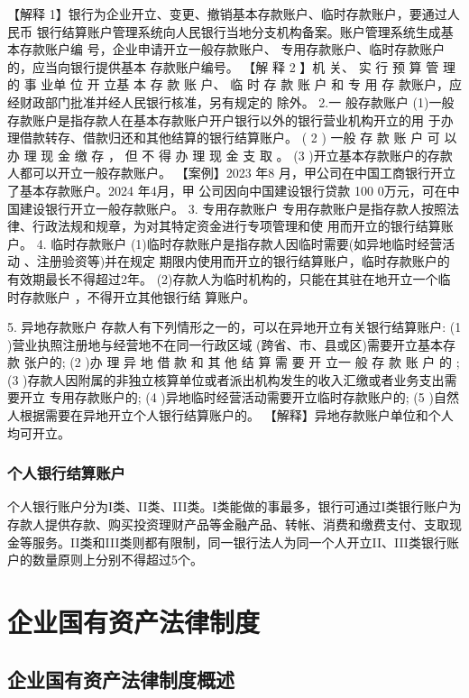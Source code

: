 \documentclass[UTF8,12pt]{ctexart}
\numberwithin{equation}{section} %
\numberwithin{figure}{section}
\numberwithin{table}{section}
\begin{document}
	【解释 1】银行为企业开立、变更、撤销基本存款账户、临时存款账户，要通过人民币
	银行结算账户管理系统向人民银行当地分支机构备案。账户管理系统生成基本存款账户编
	号，企业申请开立一般存款账户、 专用存款账户、临时存款账户的，应当向银行提供基本
	存款账户编号。
	【解 释 2 】机 关、 实 行 预 算 管 理 的 事 业单 位 开 立基 本 存 款 账 户、 临 时 存 款 账 户 和 专 用 存
	款账户，应经财政部门批准并经人民银行核准，另有规定的 除外。
	2.一 般存款账户
	(1)一般存款账户是指存款人在基本存款账户开户银行以外的银行营业机构开立的用 于办
	理借款转存、借款归还和其他结算的银行结算账户。
	( 2 ) 一般 存 款 账 户 可 以 办 理 现 金 缴 存 ， 但 不 得 办 理 现 金 支 取 。
	(3 )开立基本存款账户的存款人都可以开立一般存款账户。
	【案例】2023 年8 月，甲公司在中国工商银行开立了基本存款账户。2024 年4月，甲
	公司因向中国建设银行贷款 100 0万元，可在中国建设银行开立一般存款账户。
	3. 专用存款账户
	专用存款账户是指存款人按照法律、行政法规和规章，为对其特定资金进行专项管理和使
	用而开立的银行结算账户。
	4. 临时存款账户
	(1)临时存款账户是指存款人因临时需要(如异地临时经营活动 、注册验资等)并在规定
	期限内使用而开立的银行结算账户，临时存款账户的有效期最长不得超过2年。
	(2)存款人为临时机构的，只能在其驻在地开立一个临时存款账户 ，不得开立其他银行结
	算账户。
	
	5. 异地存款账户
	存款人有下列情形之一的，可以在异地开立有关银行结算账户:
	(1 )营业执照注册地与经营地不在同一行政区域 (跨省、市、县或区)需要开立基本存款
	张户的;
	(2 )办 理 异 地 借 款 和 其 他 结 算 需 要 开 立一 般 存 款 账 户 的 ;
	(3 )存款人因附属的非独立核算单位或者派出机构发生的收入汇缴或者业务支出需要开立
	专用存款账户的;
	(4 )异地临时经营活动需要开立临时存款账户的;
	(5 )自然人根据需要在异地开立个人银行结算账户的。
	【解释】异地存款账户单位和个人均可开立。
	
	
	
	\subsubsection{个人银行结算账户}
	个人银行账户分为I类、II类、III类。I类能做的事最多，银行可通过I类银行账户为存款人提供存款、购买投资理财产品等金融产品、转帐、消费和缴费支付、支取现金等服务。II类和III类则都有限制，同一银行法人为同一个人开立II、III类银行账户的数量原则上分别不得超过5个。
	 
	
	\newpage
	\section{企业国有资产法律制度}
	
	\subsection{企业国有资产法律制度概述}
\end{document}
